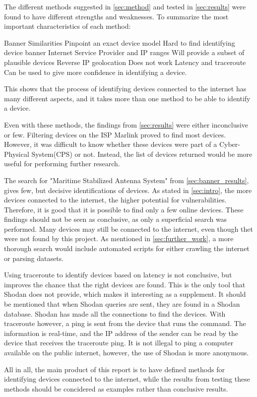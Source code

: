 \label{sec:conclusion}
The different methods suggested in \cref{sec:method} and tested in \cref{sec:results} were found to have different strengths and weaknesses. To summarize the most important characteristics of each method:

\begin{outline}[itemize]
    \setlength\itemsep{10em}
        \1 Banner Similarities
        \2 Pinpoint an exact device model
        \2 Hard to find identifying device banner
        \1 Internet Service Provider and IP ranges
        \2 Will provide a subset of plausible devices
        \1 Reverse IP geolocation
        \2 Does not work
        \1 Latency and traceroute
        \2 Can be used to give more confidence in identifying a device.

\end{outline}

This shows that the process of identifying devices connected to the internet has many different aspects, and it takes more than one method to be able to identify a device.

Even with these methods, the findings from \cref{sec:results} were either inconclusive or few. Filtering devices on the ISP Marlink proved to find most devices. However, it was difficult to know whether these devices were part of a Cyber-Physical System(CPS) or not. Instead, the list of devices returned would be more useful for performing further research. 

The search for "Maritime Stabilized Antenna System" from \cref{sec:banner_results}, gives few, but decisive identifications of devices. As stated in \cref{sec:intro}, the more devices connected to the internet, the higher potential for vulnerabilities. Therefore, it is good that it is possible to find only a few online devices. These findings should not be seen as conclusive, as only a superficial search was performed. Many devices may still be connected to the internet, even though thet were not found by this project. As mentioned in \cref{sec:further_work}, a more thorough search would include automated scripts for either crawling the internet or parsing datasets. 

Using traceroute to identify devices based on latency is not conclusive, but improves the chance that the right devices are found. This is the only tool that Shodan does not provide, which makes it interesting as a supplement. It should be mentioned that when Shodan queries are sent, they are found in a Shodan database. Shodan has made all the connections to find the devices. With traceroute however, a ping is sent from the device that runs the command. The information is real-time, and the IP address of the sender can be read by the device that receives the traceroute ping. It is not illegal to ping a computer available on the public internet, however, the use of Shodan is more anonymous. 

All in all, the main product of this report is to have defined methods for identifying devices connected to the internet, while the results from testing these methods should be concidered as examples rather than conclusive results. 
